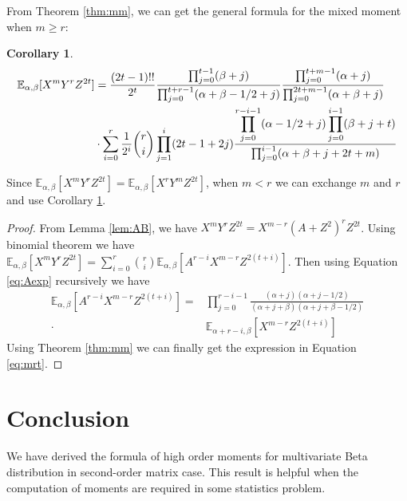\documentclass[review,authoryear]{elsarticle}
\def\E{\mathbb{E}}
\newtheorem{cor}{Corollary}
\begin{document}
From Theorem \ref{thm:mm},
we can get
the general formula for the mixed moment when $m\geq r$:
\begin{cor}\label{cor:mr}
	\begin{align}
	\E_{\alpha, \beta}[X^mY^rZ^{2t}] &= \frac{(2t-1)!!}{2^t}
	\frac{\prod_{j=0}^{t-1} (\beta+j)}{\prod_{j=0}^{t+r-1} (\alpha+\beta-1/2+j)}
	\frac{\prod_{j=0}^{t+m-1}(\alpha+j)}{\prod_{j=0}^{2t+m-1} (\alpha+\beta+j)}\notag\\
	&\cdot\sum_{i=0}^r \frac{1}{2^i}\binom{r}{i}\prod_{j=1}^i (2t-1+2j)
	\frac{\displaystyle\prod_{j=0}^{r-i-1}(\alpha-1/2+j)
		\prod_{j=0}^{i-1}(\beta+j+t)}{\prod_{j=0}^{i-1}(\alpha+\beta+j+2t+m)}
	\label{eq:mrt}
	\end{align}
\end{cor}
Since $\E_{\alpha, \beta}[X^mY^rZ^{2t}]=\E_{\alpha, \beta}[X^rY^mZ^{2t}]$, 
when $m<r$ we can exchange $m$ and $r$ and use Corollary \ref{cor:mr}.
\begin{proof}
	From Lemma \ref{lem:AB}, we have
	$X^m Y^r Z^{2t} = X^{m-r}(A+Z^2)^r Z^{2t} $.
	Using binomial theorem we have
	$\E_{\alpha, \beta}[X^m Y^r Z^{2t}] = \sum_{i=0}^r \binom{r}{i}\E_{\alpha, \beta}
	[A^{r-i}X^{m-r}Z^{2(t+i)}]$. Then using Equation \eqref{eq:Aexp} recursively
	we have 
	\begin{align*}
	\E_{\alpha, \beta}
	[A^{r-i}X^{m-r}Z^{2(t+i)}] =&
	\prod_{j=0}^{r-i-1}\frac{(\alpha+j)(\alpha+j-1/2)}
	{(\alpha+j+\beta)(\alpha+j+\beta-1/2)} \\
	\cdot & \E_{\alpha+r-i, \beta}
	[X^{m-r}Z^{2(t+i)}]
	\end{align*}
	Using Theorem \ref{thm:mm} we can finally get the expression in
	Equation \eqref{eq:mrt}.
\end{proof}
\section{Conclusion}
We have derived the formula of high order moments for multivariate Beta distribution
in second-order matrix case. This result is helpful when the computation of moments
are required in some statistics problem.


\end{document}
